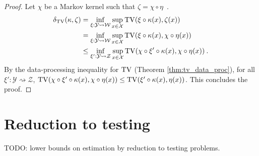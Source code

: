 \begin{proof}%
{}
Let $\chi$ be a Markov kernel such that $\zeta = \chi \circ \eta$~.
\begin{align*}
\delta_{\operatorname{TV}}(\kappa, \zeta)
&= \inf_{\xi : \mathcal Y \rightsquigarrow \mathcal W} \sup_{x \in \mathcal X} \operatorname{TV}(\xi \circ \kappa (x), \zeta(x))
\\
&= \inf_{\xi : \mathcal Y \rightsquigarrow \mathcal W} \sup_{x \in \mathcal X} \operatorname{TV}(\xi \circ \kappa (x), \chi \circ \eta(x))
\\
&\le \inf_{\xi' : \mathcal Y \rightsquigarrow \mathcal Z} \sup_{x \in \mathcal X} \operatorname{TV}(\chi \circ \xi' \circ \kappa (x), \chi \circ \eta(x))
\: .
\end{align*}
By the data-processing inequality for $\operatorname{TV}$ (Theorem \ref{thm:tv_data_proc}), for all $\xi' : \mathcal Y \rightsquigarrow \mathcal Z$, $\operatorname{TV}(\chi \circ \xi' \circ \kappa (x), \chi \circ \eta(x)) \le \operatorname{TV}(\xi' \circ \kappa (x), \eta(x))$.
This concludes the proof.
\end{proof}

\section{Reduction to testing}

TODO: lower bounds on estimation by reduction to testing problems.